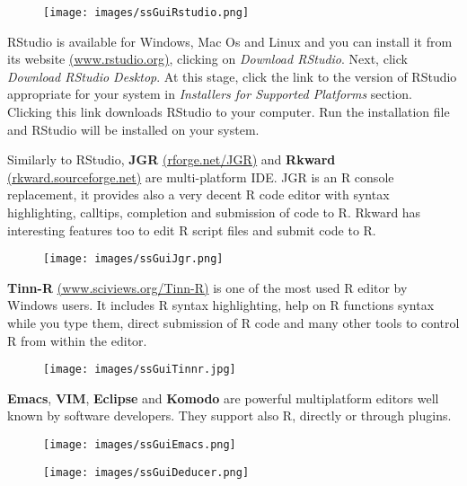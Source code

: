 \documentclass[]{book}
\begin{document}
\begin{figure}[htbp]
\centering
\texttt{[image: images/ssGuiRstudio.png]}
\caption{}
\end{figure}

\clearpage

RStudio is available for Windows, Mac Os and Linux and you can install
it from its website \href{http://www.rstudio.org/}{(www.rstudio.org)},
clicking on \emph{Download RStudio}. Next, click \emph{Download RStudio
Desktop}. At this stage, click the link to the version of RStudio
appropriate for your system in \emph{Installers for Supported Platforms}
section. Clicking this link downloads RStudio to your computer. Run the
installation file and RStudio will be installed on your system.

Similarly to RStudio, \textbf{JGR}
\href{http://rforge.net/JGR/}{(rforge.net/JGR)} and \textbf{Rkward}
\href{http://rkward.sourceforge.net/}{(rkward.sourceforge.net)} are
multi-platform IDE. JGR is an R console replacement, it provides also a
very decent R code editor with syntax highlighting, calltips, completion
and submission of code to R. Rkward has interesting features too to edit
R script files and submit code to R.

\begin{figure}[htbp]
\centering
\texttt{[image: images/ssGuiJgr.png]}
\caption{}
\end{figure}

\clearpage

\textbf{Tinn-R}
\href{http://www.sciviews.org/Tinn-R/}{(www.sciviews.org/Tinn-R)} is one
of the most used R editor by Windows users. It includes R syntax
highlighting, help on R functions syntax while you type them, direct
submission of R code and many other tools to control R from within the
editor.

\begin{figure}[htbp]
\centering
\texttt{[image: images/ssGuiTinnr.jpg]}
\caption{}
\end{figure}

\clearpage

\textbf{Emacs}, \textbf{VIM}, \textbf{Eclipse} and \textbf{Komodo} are
powerful multiplatform editors well known by software developers. They
support also R, directly or through plugins.

\begin{figure}[htbp]
\centering
\texttt{[image: images/ssGuiEmacs.png]}
\caption{}
\end{figure}

\begin{figure}[htbp]
\centering
\texttt{[image: images/ssGuiDeducer.png]}
\caption{}
\end{figure}
\end{document}
